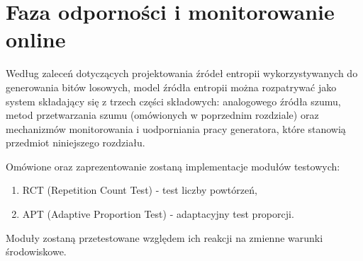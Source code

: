 
\chapter{Faza odporności i monitorowanie online}

\noindent Według zaleceń dotyczących projektowania źródeł entropii wykorzystywanych do 
generowania bitów losowych\cite{NIST-SP-800-90B}, model źródła entropii można rozpatrywać 
jako system składający się z trzech części składowych: analogowego źródła szumu, metod przetwarzania szumu (omówionych w poprzednim rozdziale) 
oraz mechanizmów monitorowania i uodporniania pracy generatora, które stanowią przedmiot niniejszego rozdziału. 

Omówione oraz zaprezentowanie zostaną implementacje modułów testowych:

\begin{enumerate}
    \item RCT (Repetition Count Test) - test liczby powtórzeń,
    \item APT (Adaptive Proportion Test) - adaptacyjny test proporcji.
\end{enumerate}

Moduły zostaną przetestowane względem ich reakcji na zmienne warunki 
środowiskowe.


